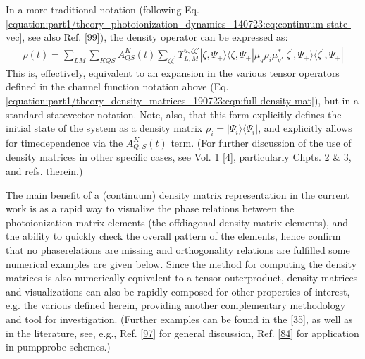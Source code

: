 \documentclass[letterpaper,table,10pt,english]{jupyterBook}
\begin{document}
\sphinxAtStartPar
In a more traditional notation (following Eq. \eqref{equation:part1/theory_photoionization_dynamics_140723:eq:continuum-state-vec}, see also Ref. {[}\hyperlink{cite.backmatter/bibliography:id636}{99}{]}), the density operator can be expressed as:
\begin{equation}\label{equation:part1/theory_density_matrices_190723:eqn:full-density-mat-traditional}
\begin{split}
\rho(t) =\sum_{LM}\sum_{KQS}A^{K}_{QS}(t)\sum_{\zeta\zeta^{\prime}}\varUpsilon_{L,M}^{u,\zeta\zeta'}|\zeta,\Psi_+\rangle\langle\zeta,\Psi_+|\mu_q\rho_i\mu_{q\prime}^{*}|\zeta^{\prime},\Psi_+\rangle\langle\zeta^{\prime},\Psi_+|
\end{split}
\end{equation}
\sphinxAtStartPar
This is, effectively, equivalent to an expansion in the various tensor operators defined in the channel function notation above (Eq. \eqref{equation:part1/theory_density_matrices_190723:eqn:full-density-mat}), but in a standard state\sphinxhyphen{}vector notation. Note, also, that this form explicitly defines the initial state of the system as a density matrix \(\rho_i = |\Psi_i\rangle\langle\Psi_i|\), and explicitly allows for time\sphinxhyphen{}dependence via the \(A_{Q,S}^{K}(t)\) term. (For further discussion of the use of density matrices in other specific cases, see  Vol. 1 {[}\hyperlink{cite.backmatter/bibliography:id676}{4}{]}, particularly Chpts. 2 \& 3, and refs. therein.)

\sphinxAtStartPar
The main benefit of a (continuum) density matrix representation in the current work is as a rapid way to visualize the phase relations between the photoionization matrix elements (the off\sphinxhyphen{}diagonal density matrix elements), and the ability to quickly check the overall pattern of the elements, hence confirm that no phase\sphinxhyphen{}relations are missing and orthogonality relations are fulfilled \sphinxhyphen{} some numerical examples are given below. Since the method for computing the density matrices is also numerically equivalent to a tensor outer\sphinxhyphen{}product, density matrices and visualizations can also be rapidly composed for other properties of interest, e.g. the various {\hyperref[\detokenize{backmatter/glossary:term-channel-functions}]{}} defined herein, providing another complementary methodology and tool for investigation. (Further examples can be found in the  {[}\hyperlink{cite.backmatter/bibliography:id605}{35}{]}, as well as in the literature, see, e.g., Ref. {[}\hyperlink{cite.backmatter/bibliography:id534}{97}{]} for general discussion, Ref. {[}\hyperlink{cite.backmatter/bibliography:id835}{84}{]} for application in pump\sphinxhyphen{}probe schemes.)
\end{document}
